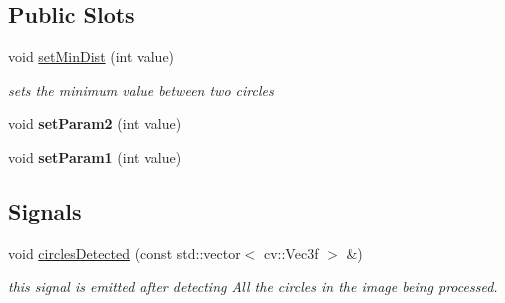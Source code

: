\subsection*{Public Slots}
\begin{DoxyCompactItemize}
\item 
void \hyperlink{class_image_processor_1_1_detect_circle_a09bb7bbe753372179b49f94370800021}{set\+Min\+Dist} (int value)
\begin{DoxyCompactList}\small\item\em sets the minimum value between two circles \end{DoxyCompactList}\item 
\mbox{\label{class_image_processor_1_1_detect_circle_a6e695fba95e0e6f78620610eee6e00ca}} 
void {\bfseries set\+Param2} (int value)
\item 
\mbox{\label{class_image_processor_1_1_detect_circle_afbc2f237cbac9eb26334953aa5d2b9f0}} 
void {\bfseries set\+Param1} (int value)
\end{DoxyCompactItemize}
\subsection*{Signals}
\begin{DoxyCompactItemize}
\item 
void \hyperlink{class_image_processor_1_1_detect_circle_a2c399b3380a2830317c701d47d4db004}{circles\+Detected} (const std\+::vector$<$ cv\+::\+Vec3f $>$ \&)
\begin{DoxyCompactList}\small\item\em this signal is emitted after detecting All the circles in the image being processed. \end{DoxyCompactList}\end{DoxyCompactItemize}
